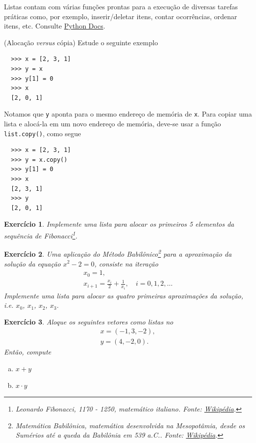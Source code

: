\documentclass[12pt]{article}
\newtheorem{exr}{Exercício}[section]
\begin{document}
\begin{obs}
  Listas contam com várias funções prontas para a execução de diversas tarefas práticas como, por exemplo, inserir/deletar itens, contar ocorrências, ordenar itens, etc. Consulte \href{https://docs.python.org/3/tutorial/datastructures.html#more-on-lists}{Python Docs}.
\end{obs}

\begin{obs}(Alocação {\it versus} cópia)
  Estude o seguinte exemplo
  \begin{lstlisting}
  >>> x = [2, 3, 1]
  >>> y = x
  >>> y[1] = 0
  >>> x
  [2, 0, 1]
  \end{lstlisting}
  Notamos que \lstinline+y+ aponta para o mesmo endereço de memória de \lstinline+x+. Para copiar uma lista e alocá-la em um novo endereço de memória, deve-se usar a função \lstinline+list.copy()+, como segue
  \begin{lstlisting}
  >>> x = [2, 3, 1]
  >>> y = x.copy()
  >>> y[1] = 0
  >>> x
  [2, 3, 1]
  >>> y
  [2, 0, 1]
  \end{lstlisting}
\end{obs}

\begin{exr}
  Implemente uma lista para alocar os primeiros 5 elementos da sequência de Fibonacci\footnote{Leonardo Fibonacci, 1170 - 1250, matemático italiano. Fonte: \href{https://pt.wikipedia.org/wiki/Leonardo\_Fibonacci}{Wikipédia}.}.
\end{exr}

\begin{exr}
  Uma aplicação do Método Babilônico\footnote{Matemática Babilônica, matemática desenvolvida na Mesopotâmia, desde os Sumérios até a queda da Babilônia em 539 a.C.. Fonte: \href{https://pt.wikipedia.org/wiki/Matem\%C3\%A1tica\_babil\%C3\%B4nica}{Wikipédia}.} para a aproximação da solução da equação $x^2-2 = 0$, consiste na iteração
  \begin{gather}
    x_0 = 1,\\
    x_{i+1} = \frac{x_i}{2} + \frac{1}{x_i},\quad i=0,1,2,\ldots
  \end{gather}
  Implemente uma lista para alocar as quatro primeiras aproximações da solução, i.e. $x_0$, $x_1$, $x_2$, $x_3$.
\end{exr}

\begin{exr}
  Aloque os seguintes vetores como listas no {\python}
  \begin{gather}
    x = (-1, 3, -2),\\
    y = (4, -2, 0).
  \end{gather}
  Então, compute
  \begin{enumerate}[a)]
  \item $x+y$
  \item $x\cdot y$
  \end{enumerate}
\end{exr}
\end{document}
